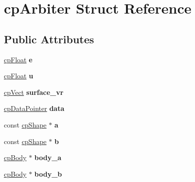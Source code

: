 \hypertarget{structcp_arbiter}{}\section{cp\+Arbiter Struct Reference}
\label{structcp_arbiter}
\subsection*{Public Attributes}
\begin{DoxyCompactItemize}
\item 
\mbox{\label{structcp_arbiter_ae28e688fb03eba42a1dd786ab914c9eb}} 
\mbox{\hyperlink{group__basic_types_gac1ed65573e035bf892505768c852d8d3}{cp\+Float}} {\bfseries e}
\item 
\mbox{\label{structcp_arbiter_a1be4918be41986330005a6e745d013f3}} 
\mbox{\hyperlink{group__basic_types_gac1ed65573e035bf892505768c852d8d3}{cp\+Float}} {\bfseries u}
\item 
\mbox{\label{structcp_arbiter_ad8724ab2c97ec732128fafc77668cc54}} 
\mbox{\hyperlink{structcp_vect}{cp\+Vect}} {\bfseries surface\+\_\+vr}
\item 
\mbox{\label{structcp_arbiter_afb41ae8c3e4df711f47ab7ac3ef7ed9a}} 
\mbox{\hyperlink{group__basic_types_ga2ac2c3c31e21893941f9e4f8ee279447}{cp\+Data\+Pointer}} {\bfseries data}
\item 
\mbox{\label{structcp_arbiter_a169358f50db550583803f105df13ae48}} 
const \mbox{\hyperlink{structcp_shape}{cp\+Shape}} $\ast$ {\bfseries a}
\item 
\mbox{\label{structcp_arbiter_a0609639e649ef29acf5f5aaeb26d2036}} 
const \mbox{\hyperlink{structcp_shape}{cp\+Shape}} $\ast$ {\bfseries b}
\item 
\mbox{\label{structcp_arbiter_a0e310136b1a4d5b46a374b35fcd49f62}} 
\mbox{\hyperlink{structcp_body}{cp\+Body}} $\ast$ {\bfseries body\+\_\+a}
\item 
\mbox{\label{structcp_arbiter_a07ad23b13b383a3fd3e4834865ad4b50}} 
\mbox{\hyperlink{structcp_body}{cp\+Body}} $\ast$ {\bfseries body\+\_\+b}

\end{DoxyCompactItemize}
